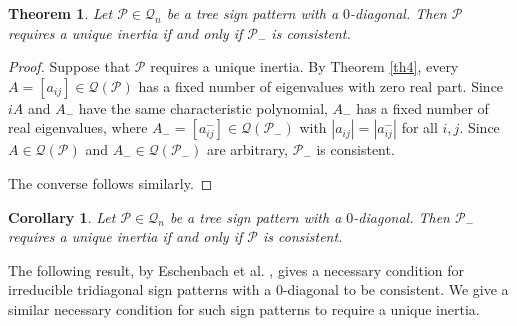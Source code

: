 \documentclass[a4paper, 10pt]{article}
\newtheorem{theorem}{Theorem}[section]
\newtheorem{cor}{Corollary}[section]
\numberwithin{equation}{section}
\begin{document}
	
	\begin{theorem} \label{th2.3}
		Let $\mathcal{P}\in \mathcal{Q}_n$ be a tree sign pattern with a $0$-diagonal. Then $\mathcal{P}$ requires a unique inertia if and only if $\mathcal{P}_-$ is consistent.
	\end{theorem}
	\begin{proof}
		Suppose that $\mathcal{P}$ requires a unique inertia. By Theorem \ref{th4}, every $A=[a_{ij}]\in \mathcal{Q}(\mathcal{P})$ has a fixed number of eigenvalues with zero real part.  Since $iA$ and $A_-$ have the same characteristic polynomial, $A_-$ has a fixed number of real eigenvalues, where $A_-=[a^-_{ij}]\in \mathcal{Q}(\mathcal{P_-})$ with $|a_{ij}|=|a^-_{ij}|$ for all $i,j$. Since $A\in \mathcal{Q}(\mathcal{P})$ and $A_- \in \mathcal{Q}(\mathcal{P_-})$ are arbitrary, $\mathcal{P}_-$ is consistent.
		
		The converse follows similarly.
	\end{proof}
	
		
	\begin{cor}\label{c2.2}
		Let $\mathcal{P}\in \mathcal{Q}_n$ be a tree sign pattern with a $0$-diagonal. Then $\mathcal{P}_-$ requires a unique inertia if and only if $\mathcal{P}$ is consistent.
	\end{cor}
	
	
	
	
	
	
	The following result, by Eschenbach et al. \cite{1}, gives a necessary condition for irreducible tridiagonal sign patterns with a $0$-diagonal to be consistent. We give a similar necessary condition for such sign patterns to require a unique inertia.
	
\end{document}
